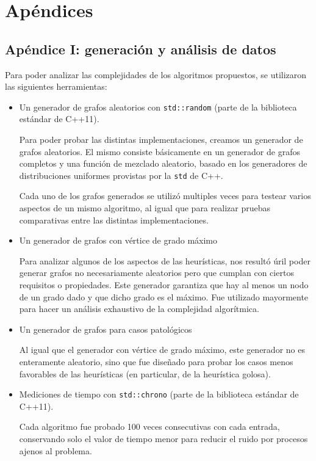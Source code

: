 \section{Apéndices}
	\subsection{Apéndice I: generación y análisis de datos}

	Para poder analizar las complejidades de los algoritmos propuestos, se utilizaron las siguientes herramientas:

	\begin{itemize}
		\item Un generador de grafos aleatorios con \texttt{std::random} (parte de la biblioteca estándar de C++11).

		Para poder probar las distintas implementaciones, creamos un generador de grafos aleatorios. El mismo consiste básicamente en un generador de grafos completos y una función de mezclado aleatorio, basado en los generadores de distribuciones uniformes provistas por la \texttt{std} de C++.

		Cada uno de los grafos generados se utilizó multiples veces para testear varios aspectos de un mismo algoritmo, al igual que para realizar pruebas comparativas entre las distintas implementaciones.

		\item Un generador de grafos con vértice de grado máximo

		Para analizar algunos de los aspectos de las heurísticas, nos resultó úril poder generar grafos no necesariamente aleatorios pero que cumplan con ciertos requisitos o propiedades. Este generador garantiza que hay al menos un nodo de un grado dado y que dicho grado es el máximo. Fue utilizado mayormente para hacer un análisis exhaustivo de la complejidad algorítmica.

		\item Un generador de grafos para casos patológicos

		Al igual que el generador con vértice de grado máximo, este generador no es enteramente aleatorio, sino que fue diseñado para probar los casos menos favorables de las heurísticas (en particular, de la heurística golosa).

		\item Mediciones de tiempo con \texttt{std::chrono} (parte de la biblioteca estándar de C++11).

		Cada algoritmo fue probado 100 veces consecutivas con cada entrada, conservando solo el valor de tiempo menor para reducir el ruido por procesos ajenos al problema.


\end{itemize}
